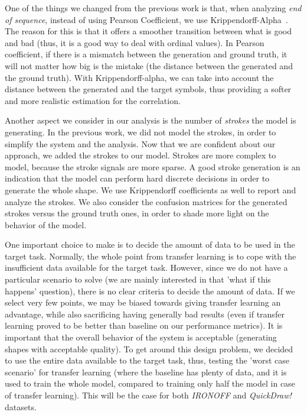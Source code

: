   \par One of the things we changed from the previous work is that, when analyzing \textit{end of sequence}, instead of using Pearson Coefficient, we use Krippendorff-Alpha~\citep{krippendorff2011computing}. The reason for this is that it offers a smoother transition between what is good and bad (thus, it is a good way to deal with ordinal values). In Pearson coefficient, if there is a mismatch between the generation and ground truth, it will not matter how big is the mistake (the distance between the generated and the ground truth). With Krippendorff-alpha, we can take into account the distance between the generated and the target symbols, thus providing a softer and more realistic estimation for the correlation.

  \par Another aspect we consider in our analysis is the number of \textit{strokes} the model is generating. In the previous work, we did not model the strokes, in order to simplify the system and the analysis. Now that we are confident about our approach, we added the strokes to our model. Strokes are more complex to model, because the stroke signals are more sparse. A good stroke generation is an indication that the model can perform hard discrete decisions in order to generate the whole shape. We use Krippendorff coefficients as well to report and analyze the strokes. We also consider the confusion matrices for the generated strokes versus the ground truth ones, in order to shade more light on the behavior of the model.

  \par One important choice to make is to decide the amount of data to be used in the target task. Normally, the whole point from transfer learning is to cope with the insufficient data available for the target task. However, since we do not have a particular scenario to solve (we are mainly interested in that 'what if this happens' question), there is no clear criteria to decide the amount of data. If we select very few points, we may be biased towards giving transfer learning an advantage, while also sacrificing having generally bad results (even if transfer learning proved to be better than baseline on our performance metrics). It is important that the overall behavior of the system is acceptable (generating shapes with acceptable quality). To get around this design problem, we decided to use the entire data available to the target task, thus, testing the 'worst case scenario' for transfer learning (where the baseline has plenty of data, and it is used to train the whole model, compared to training only half the model in case of transfer learning). This will be the case for both \textit{IRONOFF} and \textit{QuickDraw!} datasets.

